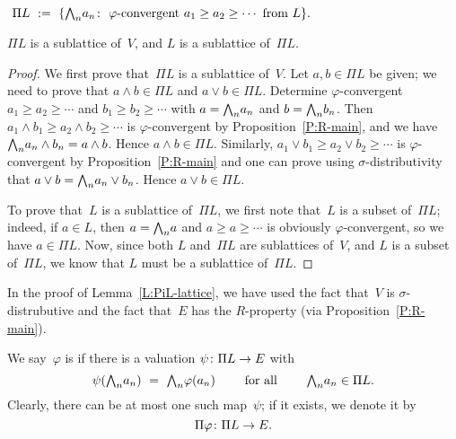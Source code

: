 \documentclass[main.tex]{subfiles}
\begin{document}
\begin{dfn}
\label{D:PiL}
$\ \Pi L \ \eqdf \ \{ 
\bw_n a_n \colon \ \text{$\varphi$-convergent }
 a_1\geq a_2 \geq\dotsb \text{ from $L$} \}.$
\end{dfn}
%
%
\begin{lem}
\label{L:PiL-lattice}
$\Pi L$ is a sublattice of~$V$,
and $L$ is a sublattice of~$\Pi L$.
\end{lem}
\begin{proof}
We first prove that~$\Pi L$ is a sublattice of~$V$.
Let $a,b\in \Pi L$ be given;
we need to prove that $a\wedge b \in \Pi L$
and $a \vee b \in \Pi L$.
Determine $\varphi$-convergent 
$a_1 \geq a_2 \geq\dotsb$ and
$b_1 \geq b_2 \geq\dotsb$
with $a = \textstyle{\bigwedge}_n a_n$ and  $b=\textstyle{\bigwedge}_n b_n$.
Then $a_1 \wedge b_1 \geq a_2 \wedge b_2 \geq \dotsb$
is $\varphi$-convergent by Proposition~\ref{P:R-main},
and we have $\textstyle{\bigwedge}_n a_n \wedge b_n = a\wedge b$.
Hence $a\wedge b \in \Pi L$.
Similarly,
$a_1 \vee b_1 \geq a_2 \vee b_2 \geq \dotsb$
is $\varphi$-convergent by Proposition~\ref{P:R-main}
and one can prove 
using $\sigma$-distributivity that $a \vee b  =\textstyle{\bigwedge}_n a_n \vee b_n$.
Hence $a\vee b \in \Pi L$.

To prove that~$L$ is a sublattice of~$\Pi L$,
we first note that~$L$ is a subset of~$\Pi L$;
indeed, if $a\in L$, then $a=\textstyle{\bigwedge}_n a$
and $a \geq a \geq \dotsb$ is obviously $\varphi$-convergent,
so we have $a \in \Pi L$.
Now,
since both $L$ and~$\Pi L$ are sublattices of~$V$,
and $L$ is a subset of~$\Pi L$,
we know that $L$ must be a sublattice of~$\Pi L$.
\end{proof}
\begin{rem}
In the proof of Lemma~\ref{L:PiL-lattice},
we have used the fact that~$V$ is $\sigma$-distrubutive
and the fact that~$E$ has the $R$-property
(via Proposition~\ref{P:R-main}).
\end{rem}

\begin{dfn}
\label{D:Pi-extendible}
We say~$\varphi$ is 
if there is a valuation $\psi \colon \Pi L \rightarrow E$ with
\begin{equation*}
\psi ( \bw_n a_n )
\ =\ 
\bw_n \varphi(a_n) 
\qquad
\text{ for all }
\qquad
\bw_n a_n \in \Pi L.
\end{equation*}
Clearly,
there can be at most one such map~$\psi$;
if it exists, we denote it by 
\begin{equation*}
\Pi \varphi\colon \Pi L \rightarrow E.
\end{equation*}
\end{dfn}
\end{document}
